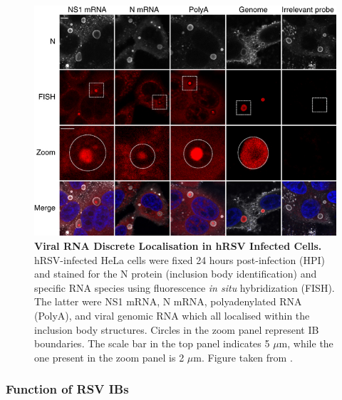 


\begin{figure}
    \centering
    \includegraphics[width=1\linewidth]{04. Introduction/Figs/11. RSV IBs.png}  
    \caption[Viral RNA Discrete Localisation in hRSV Infected Cells.]{\textbf{Viral RNA Discrete Localisation in hRSV Infected Cells.} hRSV-infected HeLa cells were fixed 24 hours post-infection (HPI) and stained for the N protein (inclusion body identification) and specific RNA species using fluorescence \textit{in situ} hybridization (FISH). The latter were NS1 mRNA, N mRNA, polyadenylated RNA (PolyA), and viral genomic RNA which all localised within the inclusion body structures. Circles in the zoom panel represent IB boundaries. The scale bar in the top panel indicates 5 \(\mu\)m, while the one present in the zoom panel is 2 \(\mu\)m. Figure taken from \cite{Rincheval2017FunctionalVirus}.}
    \label{fig:Viral RNA Discrete Localisation in hRSV Infected Cells}
\end{figure}

\subsubsection{Function of RSV IBs} \label{Function of RSV IBs}

